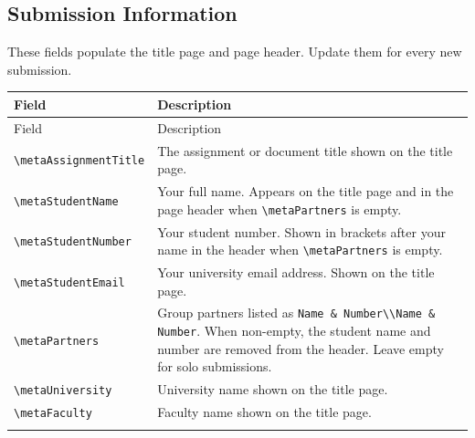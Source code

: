 	\subsection{Submission Information}
	These fields populate the title page and page header. Update them for every new submission.
	
	\begin{tabularx}{\linewidth}{@{}lL@{}}
		\caption{Submission metadata fields.}
		\label{tab:meta-submission} \\
		\toprule
		Field & Description \\
		\midrule
		\endfirsthead
		\toprule
		Field & Description \\
		\midrule
		\endhead
		\bottomrule
		\endfoot
		\bottomrule
		\endlastfoot
		\texttt{\textbackslash metaAssignmentTitle} & The assignment or document title shown on the title page. \\
		\addlinespace
		
		\texttt{\textbackslash metaStudentName}     & Your full name. Appears on the title page and in the page header when \texttt{\textbackslash metaPartners} is empty. \\
		\addlinespace
		
		\texttt{\textbackslash metaStudentNumber}   & Your student number. Shown in brackets after your name in the header when \texttt{\textbackslash metaPartners} is empty. \\
		\addlinespace
		
		\texttt{\textbackslash metaStudentEmail}    & Your university email address. Shown on the title page. \\
		\addlinespace
		
		\texttt{\textbackslash metaPartners}        & Group partners listed as \texttt{Name \& Number\textbackslash\textbackslash Name \& Number}. When non-empty, the student name and number are removed from the header. Leave empty for solo submissions. \\
		\addlinespace
		
		\texttt{\textbackslash metaUniversity}      & University name shown on the title page. \\
		\addlinespace
		
		\texttt{\textbackslash metaFaculty}         & Faculty name shown on the title page. \\
		\addlinespace
		

\end{tabularx}
